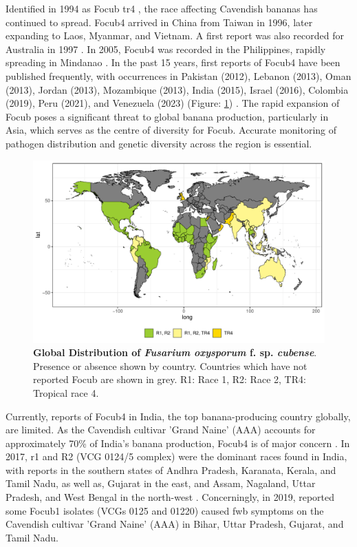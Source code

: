 Identified in 1994 as \ac{Focub} \acf{tr4} \parencite{Ploetz1994}, the race affecting Cavendish bananas has continued to spread. \Ac{Focub4} arrived in China from Taiwan in 1996, later expanding to Laos, Myanmar, and Vietnam. A first report was also recorded for Australia in 1997 \parencite{Ploetz2015a}. In 2005, \ac{Focub4} was recorded in the Philippines, rapidly spreading in Mindanao \parencite{Molina2009}. In the past 15 years, first reports of \ac{Focub4} have been published frequently, with occurrences in Pakistan (2012), Lebanon (2013), Oman (2013), Jordan (2013), Mozambique (2013), India (2015), Israel (2016), Colombia (2019), Peru (2021), and Venezuela (2023) (Figure: \ref{fig:FocDis}) \parencite{Butler2013, Ploetz2015a, Ordonez2015, Zheng2018, Thangavelu2019, Garcia-Bastida2020, Maymon2020, Kema2021, Acuna2022,  Herrera2023}.  The rapid expansion of \ac{Focub} poses a significant threat to global banana production, particularly in Asia, which serves as the centre of diversity for \ac{Focub}. Accurate monitoring of pathogen distribution and genetic diversity across the region is essential.  
\begin{figure}[h!]
  \includegraphics[width=14.5cm]{Figures/FocDis.pdf}
  \caption[Global Distribution of \textit{Fusarium oxysporum} f. sp. \textit{cubense}]{\textbf{Global Distribution of \textit{Fusarium oxysporum} f. sp. \textit{cubense}}. Presence or absence shown by country. Countries which have not reported \ac{Focub} are shown in grey. R1: Race 1, R2: Race 2, TR4: Tropical race 4.}
  \label{fig:FocDis}
\end{figure}

\vbox{
Currently, reports of \ac{Focub4} in India, the top banana-producing country globally, are limited. As the Cavendish cultivar 'Grand Naine' (AAA) accounts for approximately 70\% of India's banana production, \ac{Focub4} is of major concern \parencite{Damodaran2019}.  In 2017, \ac{r1} and R2 (VCG 0124/5 complex) were the dominant races found in India, with reports in the southern states of Andhra Pradesh, Karanata, Kerala, and Tamil Nadu, as well as, Gujarat in the east, and Assam, Nagaland, Uttar Pradesh, and West Bengal in the north-west \parencite{Mostert2017, Thangavelu2020}. Concerningly, in 2019, \textcite{Thangavelu2020} reported some \ac{Focub1} isolates (VCGs 0125 and 01220) caused \ac{fwb} symptoms on the Cavendish cultivar 'Grand Naine' (AAA) in Bihar, Uttar Pradesh, Gujarat, and Tamil Nadu. }

